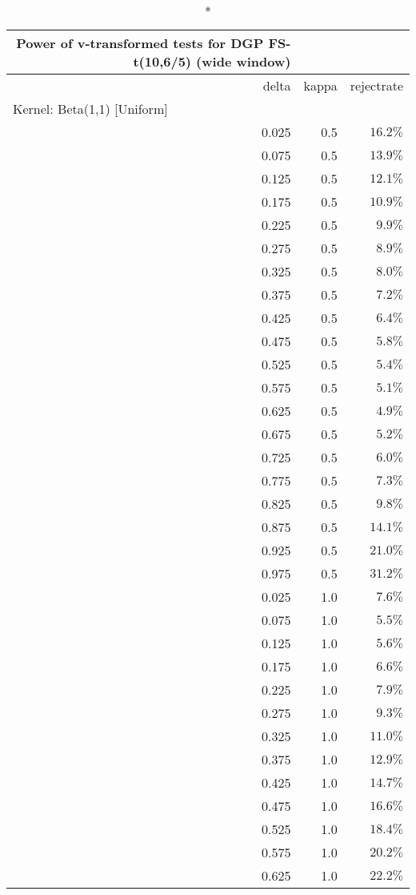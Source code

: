 \setlength{\LTpost}{0mm}
\begin{longtable}{rrr}
\caption*{
{\large Power of v-transformed tests for DGP FS-t(10,6/5) (wide window)}
} \\ 
\toprule
delta & kappa & rejectrate \\ 
\midrule
\multicolumn{3}{l}{Kernel: Beta(1,1) [Uniform]} \\ 
\midrule
0.025 & 0.5 & $16.2\%$ \\ 
0.075 & 0.5 & $13.9\%$ \\ 
0.125 & 0.5 & $12.1\%$ \\ 
0.175 & 0.5 & $10.9\%$ \\ 
0.225 & 0.5 & $9.9\%$ \\ 
0.275 & 0.5 & $8.9\%$ \\ 
0.325 & 0.5 & $8.0\%$ \\ 
0.375 & 0.5 & $7.2\%$ \\ 
0.425 & 0.5 & $6.4\%$ \\ 
0.475 & 0.5 & $5.8\%$ \\ 
0.525 & 0.5 & $5.4\%$ \\ 
0.575 & 0.5 & $5.1\%$ \\ 
0.625 & 0.5 & $4.9\%$ \\ 
0.675 & 0.5 & $5.2\%$ \\ 
0.725 & 0.5 & $6.0\%$ \\ 
0.775 & 0.5 & $7.3\%$ \\ 
0.825 & 0.5 & $9.8\%$ \\ 
0.875 & 0.5 & $14.1\%$ \\ 
0.925 & 0.5 & $21.0\%$ \\ 
0.975 & 0.5 & $31.2\%$ \\ 
0.025 & 1.0 & $7.6\%$ \\ 
0.075 & 1.0 & $5.5\%$ \\ 
0.125 & 1.0 & $5.6\%$ \\ 
0.175 & 1.0 & $6.6\%$ \\ 
0.225 & 1.0 & $7.9\%$ \\ 
0.275 & 1.0 & $9.3\%$ \\ 
0.325 & 1.0 & $11.0\%$ \\ 
0.375 & 1.0 & $12.9\%$ \\ 
0.425 & 1.0 & $14.7\%$ \\ 
0.475 & 1.0 & $16.6\%$ \\ 
0.525 & 1.0 & $18.4\%$ \\ 
0.575 & 1.0 & $20.2\%$ \\ 
0.625 & 1.0 & $22.2\%$ \\ 

\end{longtable}
